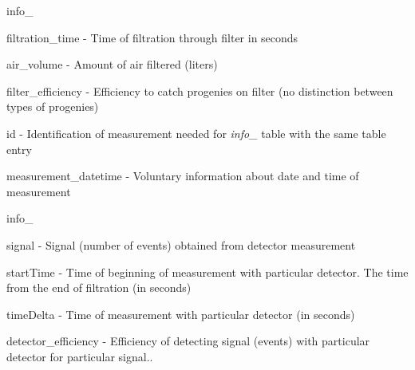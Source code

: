 \begin{DoxyItemize}
\item info\+\_
\begin{DoxyItemize}
\item {\ttfamily filtration\+\_\+time} -\/ Time of filtration through filter in seconds ~\newline

\item {\ttfamily air\+\_\+volume} -\/ Amount of air filtered (liters) ~\newline

\item {\ttfamily filter\+\_\+efficiency} -\/ Efficiency to catch progenies on filter (no distinction between types of progenies) ~\newline

\item {\ttfamily id} -\/ Identification of measurement needed for {\itshape info\+\_} table with the same table entry ~\newline

\item {\ttfamily measurement\+\_\+datetime} -\/ Voluntary information about date and time of measurement ~\newline

\end{DoxyItemize}
\item info\+\_
\begin{DoxyItemize}
\item {\ttfamily signal} -\/ Signal (number of events) obtained from detector measurement ~\newline

\item {\ttfamily start\+Time} -\/ Time of beginning of measurement with particular detector. The time from the end of filtration (in seconds) ~\newline

\item {\ttfamily time\+Delta} -\/ Time of measurement with particular detector (in seconds) ~\newline

\item {\ttfamily detector\+\_\+efficiency} -\/ Efficiency of detecting signal (events) with particular detector for particular signal.. ~\newline


\end{DoxyItemize}
\end{DoxyItemize}
